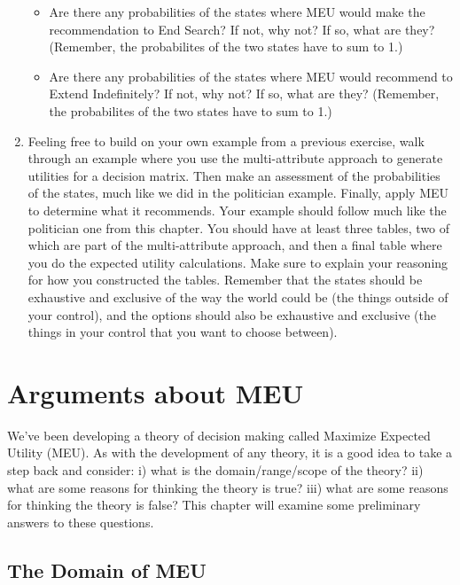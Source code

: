 \documentclass[]{tufte-book}
\providecommand{\tightlist}{%
  \setlength{\itemsep}{0pt}\setlength{\parskip}{0pt}}
\begin{document}
\begin{enumerate}
  \begin{itemize}
  \tightlist
  \item
    Are there any probabilities of the states where MEU would make the recommendation to End Search? If not, why not? If so, what are they? (Remember, the probabilites of the two states have to sum to 1.)
  \item
    Are there any probabilities of the states where MEU would recommend to Extend Indefinitely? If not, why not? If so, what are they? (Remember, the probabilites of the two states have to sum to 1.)
  \end{itemize}
\item
  Feeling free to build on your own example from a previous exercise, walk through an example where you use the multi-attribute approach to generate utilities for a decision matrix. Then make an assessment of the probabilities of the states, much like we did in the politician example. Finally, apply MEU to determine what it recommends. Your example should follow much like the politician one from this chapter. You should have at least three tables, two of which are part of the multi-attribute approach, and then a final table where you do the expected utility calculations. Make sure to explain your reasoning for how you constructed the tables. Remember that the states should be exhaustive and exclusive of the way the world could be (the things outside of your control), and the options should also be exhaustive and exclusive (the things in your control that you want to choose between).
\end{enumerate}

\hypertarget{arguments-about-meu}{%
\chapter{Arguments about MEU}\label{arguments-about-meu}}

We've been developing a theory of decision making called Maximize Expected Utility (MEU). As with the development of any theory, it is a good idea to take a step back and consider: i) what is the domain/range/scope of the theory? ii) what are some reasons for thinking the theory is true? iii) what are some reasons for thinking the theory is false? This chapter will examine some preliminary answers to these questions.

\hypertarget{the-domain-of-meu}{%
\section{The Domain of MEU}\label{the-domain-of-meu}}
\end{document}
